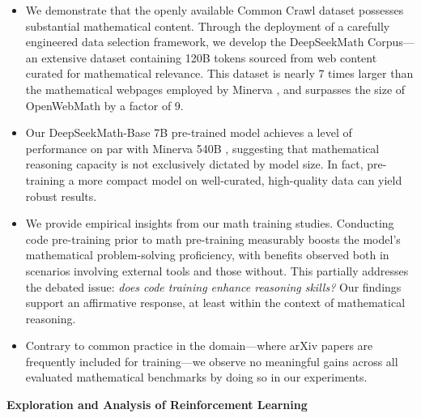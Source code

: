 \begin{itemize}[topsep=0pt]
    \item We demonstrate that the openly available Common Crawl dataset possesses substantial mathematical content. Through the deployment of a carefully engineered data selection framework, we develop the DeepSeekMath Corpus—an extensive dataset containing 120B tokens sourced from web content curated for mathematical relevance. This dataset is nearly 7 times larger than the mathematical webpages employed by Minerva \citep{minerva}, and surpasses the size of OpenWebMath \citep{openwebmath} by a factor of 9.

    \item Our DeepSeekMath-Base 7B pre-trained model achieves a level of performance on par with Minerva 540B \citep{minerva}, suggesting that mathematical reasoning capacity is not exclusively dictated by model size. In fact, pre-training a more compact model on well-curated, high-quality data can yield robust results.

    \item We provide empirical insights from our math training studies. Conducting code pre-training prior to math pre-training measurably boosts the model’s mathematical problem-solving proficiency, with benefits observed both in scenarios involving external tools and those without. This partially addresses the debated issue: \textit{does code training enhance reasoning skills?} Our findings support an affirmative response, at least within the context of mathematical reasoning.

    \item Contrary to common practice in the domain—where arXiv papers are frequently included for training—we observe no meaningful gains across all evaluated mathematical benchmarks by doing so in our experiments.
\end{itemize}

\textbf{Exploration and Analysis of Reinforcement Learning}

